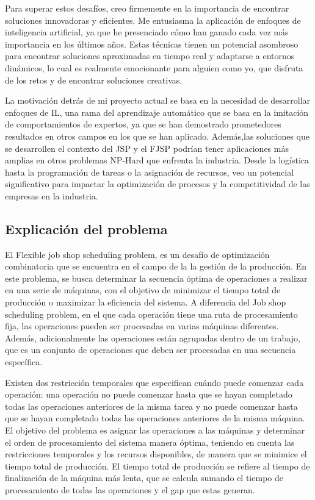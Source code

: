 Para superar estos desafíos, creo firmemente en la importancia de encontrar soluciones innovadoras y eficientes. 
Me entusiasma la aplicación de enfoques de inteligencia artificial, ya que he presenciado cómo han ganado 
cada vez más importancia en los últimos años. Estas técnicas tienen un potencial asombroso para encontrar 
soluciones aproximadas en tiempo real y adaptarse a entornos dinámicos, lo cual es realmente emocionante 
para alguien como yo, que disfruta de los retos y de encontrar soluciones creativas.\medskip

La motivación detrás de mi proyecto actual se basa en la necesidad de desarrollar enfoques de IL,
una rama del aprendizaje automático que se basa en la imitación de comportamientos de expertos,
ya que se han demostrado prometedores resultados en otros campos en los que se han aplicado. 
Además,las soluciones que se desarrollen el contexto del JSP y el FJSP podrían tener aplicaciones 
más amplias en otros problemas NP-Hard que enfrenta la industria. Desde la logística hasta la 
programación de tareas o la asignación de recursos, veo un potencial significativo 
para impactar la optimización de procesos y la competitividad de las empresas en la industria.

\subsection{Explicación del problema}
El Flexible job shop scheduling problem, es un desafío de optimización combinatoria 
que se encuentra en el campo de la la gestión de la producción. En este problema, se busca determinar 
la secuencia óptima de operaciones a realizar en una serie de máquinas, con el objetivo de minimizar el 
tiempo total de producción o maximizar la eficiencia del sistema. A diferencia del Job shop scheduling 
problem, en el que cada operación tiene una ruta de procesamiento fija, las operaciones pueden ser 
procesadas en varias máquinas diferentes. Además, adicionalmente las operaciones están agrupadas 
dentro de un trabajo, que es un conjunto de operaciones que deben ser procesadas en una secuencia
específica.\medskip

Existen dos restricción temporales que especifican cuándo puede comenzar 
cada operación: una operación no puede comenzar hasta que se hayan completado todas las operaciones
anteriores de la misma tarea y no puede comenzar hasta que se hayan completado todas las operaciones
anteriores de la misma máquina. El objetivo del problema es asignar las operaciones a las máquinas y determinar el orden de procesamiento 
del sistema manera óptima, teniendo en cuenta las restricciones temporales y los recursos disponibles, 
de manera que se minimice el tiempo total de producción. El tiempo total de producción se refiere al
tiempo de finalización de la máquina más lenta, que se calcula sumando el tiempo de procesamiento 
de todas las operaciones y el gap que estas generan.\medskip

